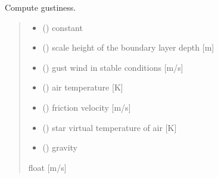 \documentclass[letterpaper,10pt,english]{sphinxmanual}
\begin{document}
\begin{fulllineitems}
\label{\detokenize{users_guide:AirSeaFluxCode.flux_subs.get_gust}}
\pysigstartsignatures
\pysiglinewithargsret
{}
{\sphinxparamcomma {}\sphinxparamcomma {}\sphinxparamcomma {}\sphinxparamcomma {}\sphinxparamcomma {}\sphinxparamcomma {}}
{}
\pysigstopsignatures
\sphinxAtStartPar
Compute gustiness.
\begin{quote}\begin{description}
\begin{itemize}
\item {}
\sphinxAtStartPar
{} () \textendash{} constant

\item {}
\sphinxAtStartPar
{} () \textendash{} scale height of the boundary layer depth {[}m{]}

\item {}
\sphinxAtStartPar
{} () \textendash{} gust wind in stable conditions   {[}m/s{]}

\item {}
\sphinxAtStartPar
{} () \textendash{} air temperature   {[}K{]}

\item {}
\sphinxAtStartPar
{} () \textendash{} friction velocity {[}m/s{]}

\item {}
\sphinxAtStartPar
{} () \textendash{} star virtual temperature of air {[}K{]}

\item {}
\sphinxAtStartPar
{} () \textendash{} gravity

\end{itemize}

\sphinxAtStartPar
{}

\sphinxAtStartPar
float        {[}m/s{]}

\end{description}\end{quote}

\end{fulllineitems}
\end{document}

